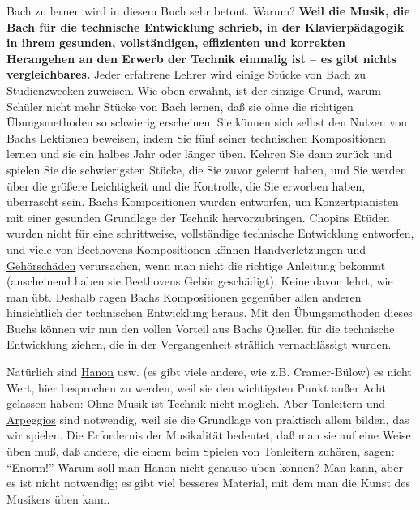 Bach zu lernen wird in diesem Buch sehr betont.
Warum?
\textbf{Weil die Musik, die Bach für die technische Entwicklung schrieb, in der Klavierpädagogik in ihrem gesunden, vollständigen, effizienten und korrekten Herangehen an den Erwerb der Technik einmalig ist -- es gibt nichts vergleichbares.}
Jeder erfahrene Lehrer wird einige Stücke von Bach zu Studienzwecken zuweisen.
Wie oben erwähnt, ist der einzige Grund, warum Schüler nicht mehr Stücke von Bach lernen, daß sie ohne die richtigen Übungsmethoden so schwierig erscheinen.
Sie können sich selbst den Nutzen von Bachs Lektionen beweisen, indem Sie fünf seiner technischen Kompositionen lernen und sie ein halbes Jahr oder länger üben.
Kehren Sie dann zurück und spielen Sie die schwierigsten Stücke, die Sie zuvor gelernt haben, und Sie werden über die größere Leichtigkeit und die Kontrolle, die Sie erworben haben, überrascht sein.
Bachs Kompositionen wurden entworfen, um Konzertpianisten mit einer gesunden Grundlage der Technik hervorzubringen.
Chopins Etüden wurden nicht für eine schrittweise, vollständige technische Entwicklung entworfen, und viele von Beethovens Kompositionen können \hyperref[c1iii10hand]{Handverletzungen} und \hyperref[c1iii10gehoer]{Gehörschäden} verursachen, wenn man nicht die richtige Anleitung bekommt (anscheinend haben sie Beethovens Gehör geschädigt).
Keine davon lehrt, wie man übt.
Deshalb ragen Bachs Kompositionen gegenüber allen anderen hinsichtlich der technischen Entwicklung heraus.
Mit den Übungsmethoden dieses Buchs können wir nun den vollen Vorteil aus Bachs Quellen für die technische Entwicklung ziehen, die in der Vergangenheit sträflich vernachlässigt wurden.

Natürlich sind \hyperref[c1iii7h]{Hanon} usw. (es gibt viele andere, wie z.B. Cramer-Bülow) es nicht Wert, hier besprochen zu werden, weil sie den wichtigsten Punkt außer Acht gelassen haben: Ohne Musik ist Technik nicht möglich.
Aber \hyperref[c1iii7d]{Tonleitern und Arpeggios} sind notwendig, weil sie die Grundlage von praktisch allem bilden, das wir spielen.
Die Erfordernis der Musikalität bedeutet, daß man sie auf eine Weise üben muß, daß andere, die einem beim Spielen von Tonleitern zuhören, sagen: \enquote{Enorm!}
Warum soll man Hanon nicht genauso üben können?
Man kann, aber es ist nicht notwendig; es gibt viel besseres Material, mit dem man die Kunst des Musikers üben kann.

